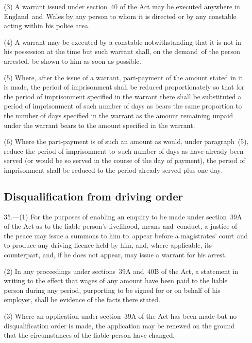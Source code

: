 \documentclass[12pt,a4paper]{article}
\begin{document}
(3) A warrant issued under section~40 of the Act may be executed anywhere in England~and~Wales by any person to whom it is directed or by any constable acting within his police area.

(4) A warrant may be executed by a constable notwithstanding that it is not in his possession at the time but such warrant shall, on the demand~of the person arrested, be shown to him as soon as possible.

(5) Where, after the issue of a warrant, part-payment of the amount stated in it is made, the period of imprisonment shall be reduced proportionately so that for the period of imprisonment specified in the warrant there shall be substituted a period of imprisonment of such number of days as bears the same proportion to the number of days specified in the warrant as the amount remaining unpaid under the warrant bears to the amount specified in the warrant.

(6) Where the part-payment is of such an amount as would, under paragraph~(5), reduce the period of imprisonment to~such number of days as have already been served (or would be so served in the course of the day of payment), the period of imprisonment shall be reduced to the period already served plus one day.

\subsection[35. Disqualification from driving order]{Disqualification from driving order}

35.---(1)  For the purposes of enabling an enquiry to be made under section~39A of the Act as to the liable person’s livelihood, means and~conduct, a justice of the peace 
may issue a summons to him to~appear before a magistrates' court and to produce any driving licence held by him, and, where applicable, its counterpart, and, if he does not appear, may issue a warrant for his arrest.

(2) In any proceedings under sections~39A and~40B of the Act, a statement in writing to the effect that wages of any amount have been paid to the liable person during any period, purporting to be signed for or on behalf of his employer, shall be evidence of the facts there stated.

(3) Where an application under section~39A of the Act has been made but no disqualification order is made, the application may be renewed on the ground that the circumstances of the liable person have changed.
\end{document}
